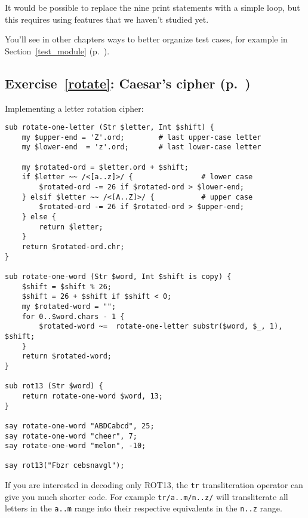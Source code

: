 It would be possible to replace the nine print statements 
with a simple loop, but this requires using features that we 
haven't studied yet.

You'll see in other chapters ways to better organize test cases,  
for example in Section~\ref{test_module} (p.~\pageref{test_module}).

\subsection{Exercise~\ref{rotate}: Caesar's cipher (p.~\pageref{rotate})}
\label{sol_rotate}

Implementing a letter rotation cipher:

\begin{verbatim}
sub rotate-one-letter (Str $letter, Int $shift) {
    my $upper-end = 'Z'.ord;        # last upper-case letter
    my $lower-end  = 'z'.ord;       # last lower-case letter

    my $rotated-ord = $letter.ord + $shift;
    if $letter ~~ /<[a..z]>/ {                # lower case
        $rotated-ord -= 26 if $rotated-ord > $lower-end;
    } elsif $letter ~~ /<[A..Z]>/ {           # upper case
        $rotated-ord -= 26 if $rotated-ord > $upper-end;
    } else {
        return $letter;
    }
    return $rotated-ord.chr;
}

sub rotate-one-word (Str $word, Int $shift is copy) {
    $shift = $shift % 26;
    $shift = 26 + $shift if $shift < 0;
    my $rotated-word = "";
    for 0..$word.chars - 1 {
        $rotated-word ~=  rotate-one-letter substr($word, $_, 1), $shift;
    }
    return $rotated-word;
}

sub rot13 (Str $word) {
    return rotate-one-word $word, 13;
} 

say rotate-one-word "ABDCabcd", 25;
say rotate-one-word "cheer", 7;
say rotate-one-word "melon", -10;

say rot13("Fbzr cebsnavgl");
\end{verbatim}

If you are interested in decoding only ROT13, the {\tt tr} 
transliteration operator can give you much shorter code. 
For example {\tt tr/a..m/n..z/} will transliterate all 
letters in the {\tt a..m} range into their respective 
equivalents in the {\tt n..z} range.

